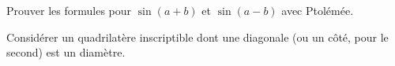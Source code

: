 






\begin{exo}
Prouver les formules pour $\sin(a+b)$ et $\sin(a-b)$ avec Ptolémée.
\begin{hint}
Considérer un quadrilatère inscriptible dont une diagonale (ou un côté, pour le second) est un diamètre.
\end{hint}
\end{exo}


